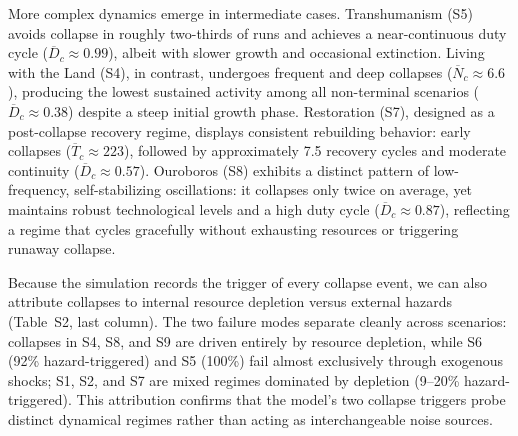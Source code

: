 More complex dynamics emerge in intermediate cases. Transhumanism (S5) avoids collapse in roughly two-thirds of runs and achieves a near-continuous duty cycle (\(\overline{D}_c \approx 0.99\)), albeit with slower growth and occasional extinction. Living with the Land (S4), in contrast, undergoes frequent and deep collapses (\(\overline{N}_c \approx 6.6\)), producing the lowest sustained activity among all non-terminal scenarios (\(\overline{D}_c \approx 0.38\)) despite a steep initial growth phase. Restoration (S7), designed as a post-collapse recovery regime, displays consistent rebuilding behavior: early collapses (\(\overline{T}_c \approx 223\)), followed by approximately 7.5 recovery cycles and moderate continuity (\(\overline{D}_c \approx 0.57\)). Ouroboros (S8) exhibits a distinct pattern of low-frequency, self-stabilizing oscillations: it collapses only twice on average, yet maintains robust technological levels and a high duty cycle (\(\overline{D}_c \approx 0.87\)), reflecting a regime that cycles gracefully without exhausting resources or triggering runaway collapse.

Because the simulation records the trigger of every collapse event, we can also attribute collapses to internal resource depletion versus external hazards (Table~S2, last column). The two failure modes separate cleanly across scenarios: collapses in S4, S8, and S9 are driven entirely by resource depletion, while S6 (92\% hazard-triggered) and S5 (100\%) fail almost exclusively through exogenous shocks; S1, S2, and S7 are mixed regimes dominated by depletion (9--20\% hazard-triggered). This attribution confirms that the model's two collapse triggers probe distinct dynamical regimes rather than acting as interchangeable noise sources.

